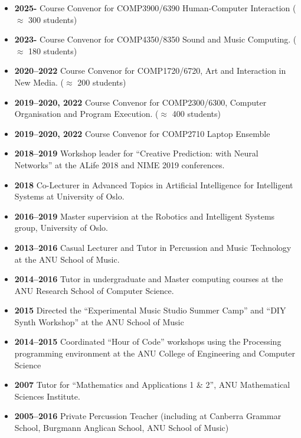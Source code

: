 \documentclass[11pt, a4paper, oneside]{article}
\begin{document}
\begin{itemize}

\item \textbf{2025-} Course Convenor for COMP3900/6390 Human-Computer Interaction ($\approx$ 300 students)

\item \textbf{2023-} Course Convenor for COMP4350/8350 Sound and Music Computing. ($\approx$ 180 students)

\item \textbf{2020--2022} Course Convenor for COMP1720/6720, Art and
  Interaction in New Media. ($\approx$ 200 students)
    
\item \textbf{2019--2020, 2022} Course Convenor for COMP2300/6300, Computer Organisation and Program Execution. ($\approx$ 400 students)

\item \textbf{2019--2020, 2022} Course Convenor for COMP2710 Laptop Ensemble
  
\item \textbf{2018--2019} Workshop leader for ``Creative Prediction: with Neural Networks'' at the ALife 2018 and NIME 2019 conferences.

\item \textbf{2018} Co-Lecturer in Advanced Topics in Artificial Intelligence for Intelligent Systems at University of Oslo.

\item \textbf{2016--2019} Master supervision at the Robotics and Intelligent Systems group, University of Oslo.
  
\item \textbf{2013--2016} Casual Lecturer and Tutor in Percussion and Music Technology at the ANU School of Music.

\item \textbf{2014--2016} Tutor in undergraduate and Master computing courses at the ANU Research School of Computer Science.

\item \textbf{2015} Directed the ``Experimental Music Studio Summer Camp'' and ``DIY Synth Workshop'' at the ANU School of Music

\item \textbf{2014--2015} Coordinated ``Hour of Code'' workshops using the Processing programming environment at the ANU College of Engineering and Computer Science

\item \textbf{2007} Tutor for ``Mathematics and Applications 1 \& 2'', ANU Mathematical Sciences Institute.

\item \textbf{2005--2016} Private Percussion Teacher (including at Canberra Grammar School, Burgmann Anglican School, ANU School of Music)

\end{itemize}
\end{document}
